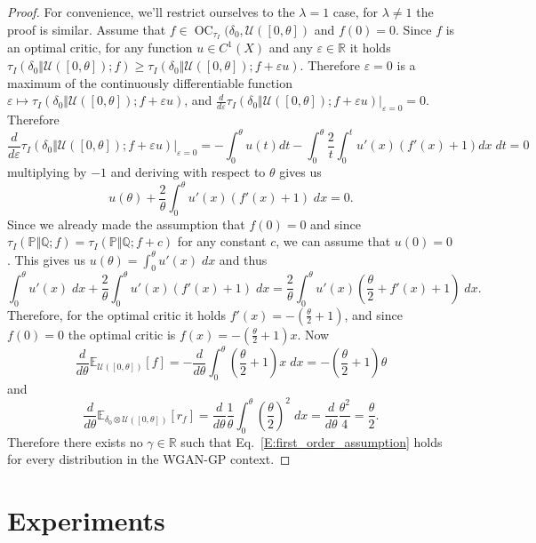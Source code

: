 \documentclass{article}
\DeclareMathOperator{\oc}{OC}
\begin{document}
 \begin{proof}
  For convenience, we'll restrict ourselves to the $\lambda=1$ case, for $\lambda\not = 1$ the proof is similar. Assume that $f\in\oc_{\tau_I}(\delta_0,\mathcal U([0,\theta])$ and $f(0)=0$. Since $f$ is an optimal critic, for any function $u\in C^1(X)$ and any $\varepsilon\in\mathbb R$
  it holds $\tau_I(\delta_0\Vert\mathcal U([0,\theta]);f)\geq \tau_I(\delta_0\Vert\mathcal U([0,\theta]);f+\varepsilon u)$. Therefore $\varepsilon=0$ is a maximum of the continuously differentiable function
  $\varepsilon\mapsto\tau_I(\delta_0\Vert\mathcal U([0,\theta]);f+\varepsilon u)$, and $\frac{d}{d\varepsilon}\tau_I(\delta_0\Vert\mathcal U([0,\theta]);f+\varepsilon u)|_{\varepsilon=0}=0$. Therefore
  \[\frac{d}{d\varepsilon}\tau_I(\delta_0\Vert\mathcal U([0,\theta]);f+\varepsilon u)|_{\varepsilon=0}=-\int_0^\theta u(t)dt-\int_0^\theta\frac 2 t \int_0^tu'(x)(f'(x)+1)dx\;dt=0\]
  multiplying by $-1$ and deriving with respect to $\theta$ gives us
  \[u(\theta)+\frac 2 \theta \int_0^\theta u'(x)(f'(x)+1)\;dx=0.\]
  Since we already made the assumption that $f(0)=0$ and since $\tau_I(\mathbb P\Vert\mathbb Q;f)=\tau_I(\mathbb P\Vert\mathbb Q;f+c)$ for any constant $c$, we can assume that $u(0)=0$.
  This gives us $u(\theta)=\int_0^\theta u'(x)\;dx$ and thus
  \[\int_0^\theta u'(x)\;dx+\frac 2 \theta \int_0^\theta u'(x)(f'(x)+1)\;dx = \frac 2 \theta \int_0^\theta u'(x)\left(\frac \theta 2 + f'(x)+1\right)\;dx.\]
  Therefore, for the optimal critic it holds $f'(x)=-(\frac\theta 2 + 1)$, and since $f(0)=0$ the optimal critic is $f(x)=-(\frac\theta 2 + 1)x$. Now
  \[\frac{d}{d\theta}\mathbb E_{\mathcal U([0,\theta])}[f]=-\frac{d}{d\theta}\int_0^\theta\left(\frac\theta 2 + 1\right)x\;dx=-\left(\frac\theta 2 + 1\right)\theta\]
  and
  \[\frac{d}{d\theta}\mathbb E_{\delta_0\otimes\mathcal U([0,\theta])}[r_f]=\frac{d}{d\theta}\frac 1 \theta\int_0^\theta\left(\frac\theta 2\right)^2\;dx=\frac{d}{d\theta}\frac{\theta^2}{4}=\frac{\theta}{2}.\]
  Therefore there exists no $\gamma\in\mathbb R$ such that Eq.\ \ref{E:first_order_assumption} holds for every distribution in the WGAN-GP context.
 \end{proof}

 \section{Experiments}
\end{document}
